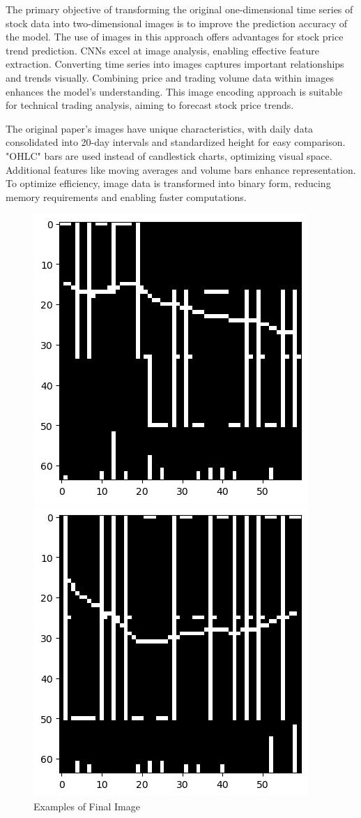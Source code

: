 \documentclass{article}
\begin{document}
The primary objective of transforming the original one-dimensional time series of stock data into two-dimensional images is to improve the prediction accuracy of the model. The use of images in this approach offers advantages for stock price trend prediction. CNNs excel at image analysis, enabling effective feature extraction. Converting time series into images captures important relationships and trends visually. Combining price and trading volume data within images enhances the model's understanding. This image encoding approach is suitable for technical trading analysis, aiming to forecast stock price trends.

The original paper's images have unique characteristics, with daily data consolidated into 20-day intervals and standardized height for easy comparison. "OHLC" bars are used instead of candlestick charts, optimizing visual space. Additional features like moving averages and volume bars enhance representation. To optimize efficiency, image data is transformed into binary form, reducing memory requirements and enabling faster computations.

\begin{figure}[H]
	\centering
	\begin{minipage}[b]{0.4\linewidth}
		\centering
		\includegraphics[width=0.6\linewidth]{2_1Examples of Final Image.png} 
	\end{minipage}
	\hfill
	\begin{minipage}[b]{0.4\linewidth}
		\centering
		\includegraphics[width=0.6\linewidth]{2_2Examples of Final Image.png} 
	\end{minipage}
	\caption{Examples of Final Image}
\end{figure}
\end{document}
